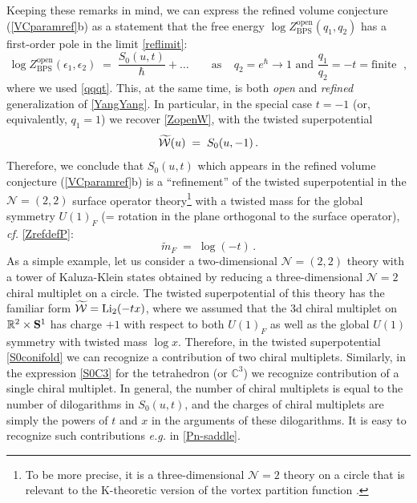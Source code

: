 \documentclass[hyper,letterpaper]{JHEP3}
\newcommand{\be}{\begin{equation}}
\newcommand{\ee}{\end{equation}}
\newcommand{\R}{{\mathbb R}}
\newcommand{\C}{{\mathbb C}}
\newcommand{\cN}{{\mathcal{N}}}
\renewcommand{\S}{{\bf S}}
\begin{document}
Keeping these remarks in mind, we can express the refined volume conjecture (\ref{VCparamref}b)
as a statement that the free energy $\log Z_{\text{BPS}}^{\text{open}} (q_1, q_2)$
has a first-order pole in the limit \eqref{reflimit}:
\be
\log Z_{\text{BPS}}^{\text{open}} (\epsilon_1, \epsilon_2)
\; = \; \frac{S_0 (u,t)}{\hbar} + \ldots
\qquad \text{as~~} \boxed{ \phantom{I} q_2 = e^{\hbar} \to 1
\text{~and~} \frac{q_1}{q_2} = - t = \text{finite}~}~ \,,
\label{logZopenSt}
\ee
where we used \eqref{qqqt}.
This, at the same time, is both {\it open} and {\it refined} generalization of \eqref{YangYang}.
In particular, in the special case $t = -1$ (or, equivalently, $q_1 = 1$)
we recover \eqref{ZopenW}, with the twisted superpotential
\be
\widetilde{\cal W} (u) \; = \; S_0 (u,-1) \,.
\ee
Therefore, we conclude that $S_0 (u,t)$ which appears in the refined volume conjecture (\ref{VCparamref}b)
is a ``refinement'' of the twisted superpotential in the $\cN=(2,2)$ surface operator theory\footnote{To be more precise,
it is a three-dimensional $\cN=2$ theory on a circle that is relevant to the K-theoretic version of the vortex partition function \cite{DGH}.}
with a twisted mass for the global symmetry
$U(1)_F$ (= rotation in the plane orthogonal to the surface operator), {\it cf.} \eqref{ZrefdefP}:
\be
\tilde m_F \; = \; \log (-t) \,.
\label{mftrel}
\ee
As a simple example, let us consider a two-dimensional $\cN=(2,2)$ theory with a tower of Kaluza-Klein states
obtained by reducing a three-dimensional $\cN=2$ chiral multiplet on a circle.
The twisted superpotential of this theory has the familiar form $\widetilde{\cal W} = \textrm{Li}_2(-t x)$,
where we assumed that the 3d chiral multiplet on $\R^2 \times \S^1$ has charge $+1$
with respect to both $U(1)_F$ as well as the global $U(1)$ symmetry with twisted mass $\log x$.
Therefore, in the twisted superpotential \eqref{S0conifold} we can recognize a contribution of two chiral multiplets.
Similarly, in the expression \eqref{S0C3} for the tetrahedron (or $\C^3$) we recognize contribution of a single chiral multiplet.
In general, the number of chiral multiplets is equal to the number of dilogarithms in $S_0 (u,t)$,
and the charges of chiral multiplets are simply the powers of $t$ and $x$ in the arguments of these dilogarithms.
It is easy to recognize such contributions {\it e.g.} in \eqref{Pn-saddle}.
\end{document}
